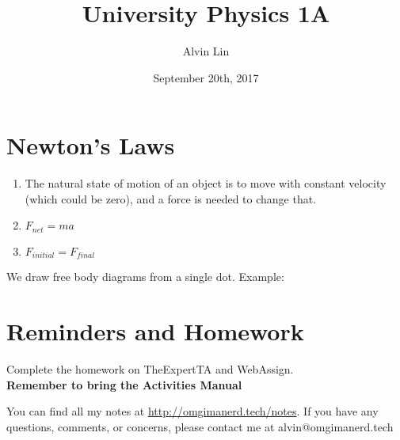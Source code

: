 \documentclass[letterpaper, 12pt]{math}
\title{University Physics 1A}
\author{Alvin Lin}
\date{September 20th, 2017}
\begin{document}
\maketitle

\section*{Newton's Laws}

\begin{enumerate}
  \item The natural state of motion of an object is to move with
    constant velocity (which could be zero), and a force is needed to
    change that.
  \item \( F_{net} = ma \)
  \item \( F_{initial} = F_{final} \)
\end{enumerate}
We draw free body diagrams from a single dot. Example:
\begin{center}
\end{center}


\section*{Reminders and Homework}
Complete the homework on TheExpertTA and WebAssign. \\
\textbf{Remember to bring the Activities Manual}

\begin{center}
  You can find all my notes at \url{http://omgimanerd.tech/notes}. If you have
  any questions, comments, or concerns, please contact me at
  alvin@omgimanerd.tech
\end{center}
\end{document}
